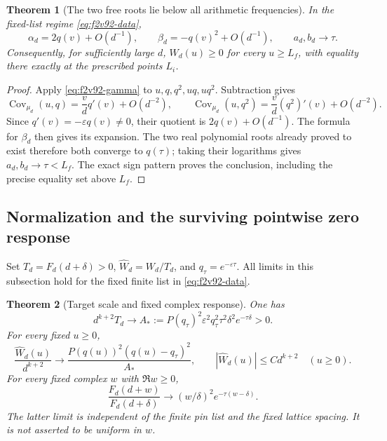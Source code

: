 \documentclass[11pt]{article}
\newtheorem{theorem}{Theorem}[section]
\theoremstyle{definition}
\theoremstyle{remark}
\begin{document}
\begin{theorem}[The two free roots lie below all arithmetic frequencies]
\label{thm:f2v92-tail}
In the fixed-list regime \eqref{eq:f2v92-data},
\begin{equation}
 \alpha_d=2q(v)+O(d^{-1}),\qquad
 \beta_d=-q(v)^2+O(d^{-1}),\qquad a_d,b_d\to\tau.
 \label{eq:f2v92-root-limit}
\end{equation}
Consequently, for sufficiently large \(d\),
\(W_d(u)\ge0\) for every \(u\ge L_f\), with equality there
exactly at the prescribed points \(L_i\).
\end{theorem}

\begin{proof}
Apply \eqref{eq:f2v92-gamma} to \(u,q,q^2,uq,uq^2\).
Subtraction gives
\[
 \operatorname{Cov}_{\mu_d}(u,q)
 =\frac vd q'(v)+O(d^{-2}),\qquad
 \operatorname{Cov}_{\mu_d}(u,q^2)
 =\frac vd (q^2)'(v)+O(d^{-2}).
\]
Since \(q'(v)=-\varepsilon q(v)\ne0\), their quotient is
\(2q(v)+O(d^{-1})\).  The formula for \(\beta_d\) then gives
its expansion.  The two real polynomial roots already proved to exist
therefore both converge to \(q(\tau)\); taking their logarithms
gives \(a_d,b_d\to\tau<L_f\).  The exact sign pattern proves
the conclusion, including the precise equality set above \(L_f\).
\end{proof}

\subsection{Normalization and the surviving pointwise zero response}

Set \(T_d=F_d(d+\delta)>0\), \(\widehat W_d=W_d/T_d\), and
\(q_\tau=e^{-\varepsilon\tau}\).  All limits in this subsection
hold for the fixed finite list in \eqref{eq:f2v92-data}.

\begin{theorem}[Target scale and fixed complex response]
\label{thm:f2v92-normalization}
One has
\begin{equation}
 d^{k+2}T_d\longrightarrow
 A_*:=P(q_\tau)^2\varepsilon^2q_\tau^2
          \tau^2\delta^2e^{-\tau\delta}>0.
 \label{eq:f2v92-target}
\end{equation}
For every fixed \(u\ge0\),
\begin{equation}
 \frac{\widehat W_d(u)}{d^{k+2}}
 \longrightarrow
 \frac{P(q(u))^2(q(u)-q_\tau)^2}{A_*},
 \qquad |\widehat W_d(u)|\le C d^{k+2}\quad(u\ge0).
 \label{eq:f2v92-time-limit}
\end{equation}
For every fixed complex \(w\) with \(\Re w\ge0\),
\begin{equation}
 \frac{F_d(d+w)}{F_d(d+\delta)}
 \longrightarrow (w/\delta)^2e^{-\tau(w-\delta)}.
 \label{eq:f2v92-complex-limit}
\end{equation}
The latter limit is independent of the finite pin list and the fixed
lattice spacing.  It is not asserted to be uniform in \(w\).
\end{theorem}
\end{document}
